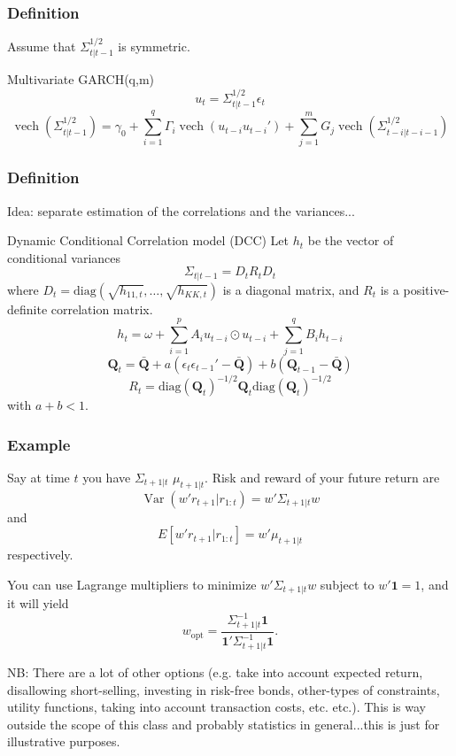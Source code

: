 \documentclass{beamer}
\begin{document}

\begin{frame}
\frametitle{Definition}

Assume that $\Sigma_{t|t-1}^{1/2}$ is symmetric. 
\begin{block}{ Multivariate GARCH(q,m)}
\[
u_t = \Sigma_{t|t-1}^{1/2}\epsilon_t
\]
\[
\operatorname{vech}\left( \Sigma_{t|t-1}^{1/2} \right)= \gamma_0 + \sum_{i=1}^q \Gamma_i \operatorname{vech}(u_{t-i} u_{t-i}') +  \sum_{j=1}^m G_j\operatorname{vech}(\Sigma_{t-i|t-i-1}^{1/2})
\]
\end{block}



\end{frame}


\begin{frame}
\frametitle{Definition}

Idea: separate estimation of the correlations and the variances...
\begin{block}{ Dynamic Conditional Correlation model (DCC)}
Let $h_t$ be the vector of conditional variances
\[
\Sigma_{t|t-1} = D_t R_t D_t
\]
where $D_t = \text{diag}(\sqrt{h_{11,t}}, \ldots, \sqrt{h_{KK,t}} )$ is a diagonal matrix, and $R_t$ is a positive-definite correlation matrix. 
\[
h_t = \omega + \sum_{i=1}^p A_i u_{t-i} \odot u_{t-i} + \sum_{j=1}^q B_i h_{t-i}
\]
\[
\mathbf{Q}_t = \bar{\mathbf{Q}} + a(\epsilon_t \epsilon_{t-1}' - \bar{\mathbf{Q}}) + b(\mathbf{Q}_{t-1} - \bar{\mathbf{Q}})
\]
\[
R_t = \text{diag}(\mathbf{Q}_t)^{-1/2}\mathbf{Q}_t\text{diag}(\mathbf{Q}_t)^{-1/2}
\]
with $a+b < 1$.
\end{block}



\end{frame}


\begin{frame}
\frametitle{Example}

Say at time $t$ you have $\Sigma_{t+1|t}$ $\mu_{t+1|t}$. Risk and reward of your future return are
\[
\operatorname{Var}(w' r_{t+1} | r_{1:t}) = w'\Sigma_{t+1|t}w
\]
and
\[
E[w'r_{t+1} | r_{1:t}] = w'\mu_{t+1|t}
\]
respectively.

You can use Lagrange multipliers to minimize $w'\Sigma_{t+1|t}w$ subject to $w'\bm{1} = 1$, and it will yield
\[
w_{\text{opt}} = \frac{\Sigma_{t+1|t}^{-1}\bm{1}  }{ \bm{1} '\Sigma_{t+1|t}^{-1}\bm{1}}.
\]

NB: There are a lot of other options (e.g. take into account expected return, disallowing short-selling, investing in risk-free bonds, other-types of constraints, utility functions, taking into account transaction costs, etc. etc.). This is way outside the scope of this class and probably statistics in general...this is just for illustrative purposes.

\end{frame}
\end{document}
